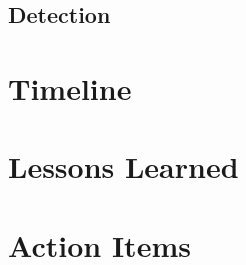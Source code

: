 \documentclass{article}   	%
\begin{document}
\vspace{12mm}

\subsection{Detection}

\vspace{6mm}

\newpage

\section{Timeline}

\newpage

\section{Lessons Learned}

\vspace{80mm}

\section{Action Items}
\end{document}
